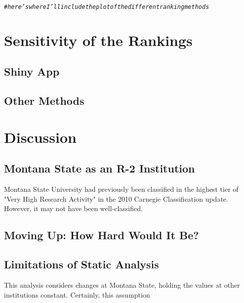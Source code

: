 \documentclass{article}\usepackage[]{graphicx}\usepackage[]{color}
\makeatletter
\newcommand{\hlcom}[1]{\textcolor[rgb]{0.678,0.584,0.686}{\textit{#1}}}%
\newenvironment{kframe}{%
 \def\at@end@of@kframe{}%
 \ifinner\ifhmode%
  \def\at@end@of@kframe{\end{minipage}}%
  \begin{minipage}{\columnwidth}%
 \fi\fi%
 \def\FrameCommand##1{\hskip\@totalleftmargin \hskip-\fboxsep
 \colorbox{shadecolor}{##1}\hskip-\fboxsep
     \hskip-\linewidth \hskip-\@totalleftmargin \hskip\columnwidth}%
 \MakeFramed {\advance\hsize-\width
   \@totalleftmargin\z@ \linewidth\hsize
   \@setminipage}}%
 {\par\unskip\endMakeFramed%
 \at@end@of@kframe}
\newenvironment{knitrout}{}{} %
\makeatother
\begin{document}
\begin{knitrout}
\color{fgcolor}\begin{kframe}
\begin{alltt}
\hlcom{#here's where I'll include the plot of the different ranking methods}
\end{alltt}
\end{kframe}
\end{knitrout}


\section{Sensitivity of the Rankings}
  \subsection{Shiny App}
  \subsection{Other Methods}
  
\section{Discussion}
  \subsection{Montana State as an R-2 Institution}
  Montana State University had previously been classified in the highest tier of "Very High Research Activity" in the 2010 Carnegie Classification update. However, it may not have been well-classified. 
  
  
  \subsection{Moving Up: How Hard Would It Be?}
  \subsection{Limitations of Static Analysis}
This analysis considers changes at Montana State, holding the values at other institutions constant. Certainly, this assumption 
\end{document}

